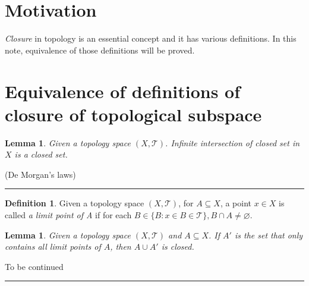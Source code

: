 \documentclass[12pt]{article}
\numberwithin{equation}{section}
\theoremstyle{plain} %
\newtheorem{lemma}[equation]{Lemma}
\theoremstyle{definition}
\newtheorem{definition}[equation]{Definition}
\theoremstyle{remark}
\newenvironment{proof}{{\bf Proof:}}{\hfill\rule{2mm}{2mm}}
\begin{document}

\section{Motivation}
\textit{Closure} in topology is an essential concept and it has various definitions. In this note, equivalence of those definitions will be proved.

\section{Equivalence of definitions of closure of topological subspace}

\begin{lemma}
Given a topology space $(X, \mathcal{T})$. Infinite intersection of closed set in $X$ is a closed set. \label{lemma:intersection of closed set is closed set}
\end{lemma}

\begin{proof}
(De Morgan's laws)
\end{proof}

\begin{definition}
Given a topology space $(X, \mathcal{T})$, for $A \subseteq X$, a point $x \in X$ is called \textit{a limit point of A} if for each $B \in \{B: x \in B \in \mathcal{T} \}, B \cap A \neq \varnothing$. \label{definition:limit point}
\end{definition}

\begin{lemma}
Given a topology space $(X, \mathcal{T})$ and $A \subseteq X$. If $A'$ is the set that only contains all limit points of $A$, then $A \cup A'$ is closed.  \label{lemma:limit point set is closed}
\end{lemma}

\begin{proof}
To be continued
\end{proof}
\end{document}
